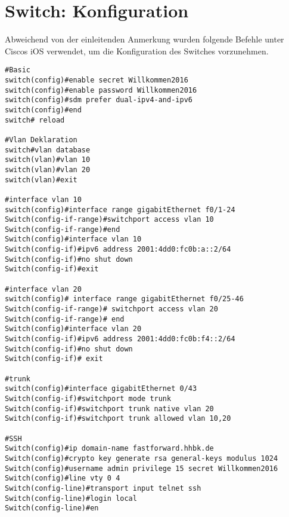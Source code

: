 \section{Switch: Konfiguration}

Abweichend von der einleitenden Anmerkung wurden folgende Befehle unter Ciscos iOS verwendet, um die Konfiguration des Switches vorzunehmen.

\begin{lstlisting}[numbers=none]
#Basic
switch(config)#enable secret Willkommen2016
switch(config)#enable password Willkommen2016
switch(config)#sdm prefer dual-ipv4-and-ipv6
switch(config)#end
switch# reload

#Vlan Deklaration
switch#vlan database 
switch(vlan)#vlan 10
switch(vlan)#vlan 20
switch(vlan)#exit

#interface vlan 10
switch(config)#interface range gigabitEthernet f0/1-24 
Switch(config-if-range)#switchport access vlan 10
Switch(config-if-range)#end
Switch(config)#interface vlan 10
Switch(config-if)#ipv6 address 2001:4dd0:fc0b:a::2/64
Switch(config-if)#no shut down
Switch(config-if)#exit

#interface vlan 20
switch(config)# interface range gigabitEthernet f0/25-46
Switch(config-if-range)# switchport access vlan 20
Switch(config-if-range)# end
Switch(config)#interface vlan 20
Switch(config-if)#ipv6 address 2001:4dd0:fc0b:f4::2/64
Switch(config-if)#no shut down
Switch(config-if)# exit

#trunk
switch(config)#interface gigabitEthernet 0/43
Switch(config-if)#switchport mode trunk
Switch(config-if)#switchport trunk native vlan 20
Switch(config-if)#switchport trunk allowed vlan 10,20

#SSH
Switch(config)#ip domain-name fastforward.hhbk.de
Switch(config)#crypto key generate rsa general-keys modulus 1024
Switch(config)#username admin privilege 15 secret Willkommen2016
Switch(config)#line vty 0 4
Switch(config-line)#transport input telnet ssh
Switch(config-line)#login local
Switch(config-line)#en
\end{lstlisting}